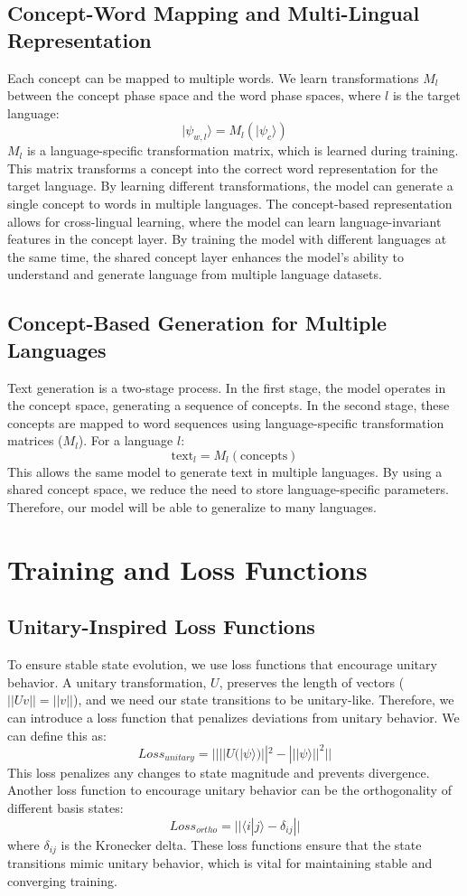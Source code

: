 \documentclass[11pt, a4paper]{article}
\begin{document}
\subsection{Concept-Word Mapping and Multi-Lingual Representation}

Each concept can be mapped to multiple words. We learn transformations $M_l$ between the concept phase space and the word phase spaces, where $l$ is the target language:
$$
|\psi_{w,l}\rangle = M_l(|\psi_c\rangle)
$$
$M_l$ is a language-specific transformation matrix, which is learned during training. This matrix transforms a concept into the correct word representation for the target language. By learning different transformations, the model can generate a single concept to words in multiple languages. The concept-based representation allows for cross-lingual learning, where the model can learn language-invariant features in the concept layer. By training the model with different languages at the same time, the shared concept layer enhances the model’s ability to understand and generate language from multiple language datasets.

\subsection{Concept-Based Generation for Multiple Languages}

Text generation is a two-stage process. In the first stage, the model operates in the concept space, generating a sequence of concepts. In the second stage, these concepts are mapped to word sequences using language-specific transformation matrices ($M_l$). For a language $l$:
$$
\text{text}_l = M_l ( \text{concepts})
$$
This allows the same model to generate text in multiple languages. By using a shared concept space, we reduce the need to store language-specific parameters. Therefore, our model will be able to generalize to many languages.

\section{Training and Loss Functions}

\subsection{Unitary-Inspired Loss Functions}

To ensure stable state evolution, we use loss functions that encourage unitary behavior. A unitary transformation, $U$, preserves the length of vectors ($||Uv|| = ||v||$), and we need our state transitions to be unitary-like. Therefore, we can introduce a loss function that penalizes deviations from unitary behavior. We can define this as:
$$
Loss_{unitary} = || ||U( |\psi\rangle) ||^2 - || |\psi\rangle ||^2 ||
$$
This loss penalizes any changes to state magnitude and prevents divergence. Another loss function to encourage unitary behavior can be the orthogonality of different basis states:
$$
Loss_{ortho} = ||\langle i| j \rangle - \delta_{ij} ||
$$
where $\delta_{ij}$ is the Kronecker delta. These loss functions ensure that the state transitions mimic unitary behavior, which is vital for maintaining stable and converging training.
\end{document}
